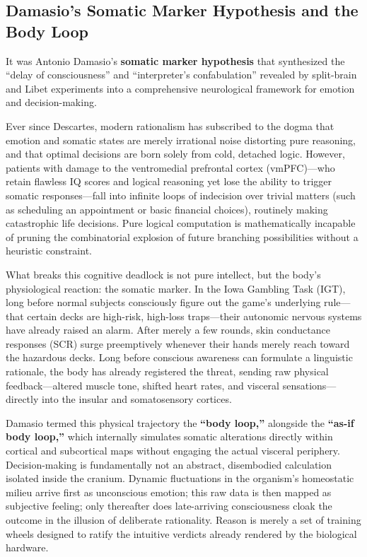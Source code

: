     \subsection{Damasio's Somatic Marker Hypothesis and the Body Loop}
    It was Antonio Damasio's \textbf{somatic marker hypothesis} that synthesized the ``delay of consciousness'' and ``interpreter's confabulation'' revealed by split-brain and Libet experiments into a comprehensive neurological framework for emotion and decision-making.

    Ever since Descartes, modern rationalism has subscribed to the dogma that emotion and somatic states are merely irrational noise distorting pure reasoning, and that optimal decisions are born solely from cold, detached logic. However, patients with damage to the ventromedial prefrontal cortex (vmPFC)—who retain flawless IQ scores and logical reasoning yet lose the ability to trigger somatic responses—fall into infinite loops of indecision over trivial matters (such as scheduling an appointment or basic financial choices), routinely making catastrophic life decisions. Pure logical computation is mathematically incapable of pruning the combinatorial explosion of future branching possibilities without a heuristic constraint.

    What breaks this cognitive deadlock is not pure intellect, but the body's physiological reaction: the somatic marker.
    In the Iowa Gambling Task (IGT), long before normal subjects consciously figure out the game's underlying rule—that certain decks are high-risk, high-loss traps—their autonomic nervous systems have already raised an alarm. After merely a few rounds, skin conductance responses (SCR) surge preemptively whenever their hands merely reach toward the hazardous decks. Long before conscious awareness can formulate a linguistic rationale, the body has already registered the threat, sending raw physical feedback—altered muscle tone, shifted heart rates, and visceral sensations—directly into the insular and somatosensory cortices.

    Damasio termed this physical trajectory the \textbf{``body loop,''} alongside the \textbf{``as-if body loop,''} which internally simulates somatic alterations directly within cortical and subcortical maps without engaging the actual visceral periphery.
    Decision-making is fundamentally not an abstract, disembodied calculation isolated inside the cranium. Dynamic fluctuations in the organism's homeostatic milieu arrive first as unconscious emotion; this raw data is then mapped as subjective feeling; only thereafter does late-arriving consciousness cloak the outcome in the illusion of deliberate rationality. Reason is merely a set of training wheels designed to ratify the intuitive verdicts already rendered by the biological hardware.
\fi

